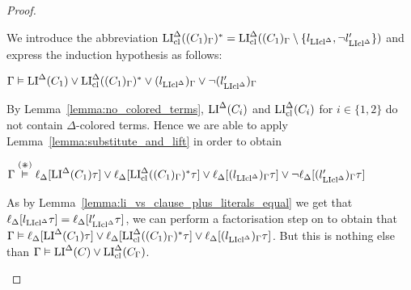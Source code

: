 \documentclass[,%
	draft=false,%
	numbers=noendperiod
	11pt,
	a4paper,
	oneside,%
	openany,
]{memoir}
\begin{document}
\begin{proof}
\begin{description}
			We introduce the abbreviation
			$\operatorname{LI}_{\operatorname{cl}}^\Delta( (C_1)_\Gamma)^* = \operatorname{LI}_{\operatorname{cl}}^\Delta( (C_1)_\Gamma \setminus \{l_{\operatorname{LIcl}^\Delta}, \lnot l'_{\operatorname{LIcl}^\Delta}\} )$
			and express the induction hypothesis as follows:

			$\Gamma \vDash \operatorname{LI}^\Delta(C_1) \lor \operatorname{LI}_{\operatorname{cl}}^\Delta( (C_1)_\Gamma)^* \lor (l_{\operatorname{LIcl}^\Delta})_\Gamma \lor \lnot (l'_{\operatorname{LIcl}^\Delta})_\Gamma$

			By Lemma~\ref{lemma:no_colored_terms}, $\operatorname{LI}^\Delta(C_i)$ and $\operatorname{LI}_{\operatorname{cl}}^\Delta(C_i)$ for $i\in\{1,2\}$ do not contain $\Delta$-colored terms. 
			Hence we are able to apply Lemma~\ref{lemma:substitute_and_lift} in order to obtain

			$\Gamma \stackrel{(\divideontimes)}{\vDash} \ell_{\Delta}[\operatorname{LI}^\Delta(C_1)\tau] \lor \ell_{\Delta}[\operatorname{LI}_{\operatorname{cl}}^\Delta( (C_1)_\Gamma)^*\tau] \lor \ell_{\Delta}[(l_{\operatorname{LIcl}^\Delta})_\Gamma\tau] \lor \lnot \ell_{\Delta}[(l'_{\operatorname{LIcl}^\Delta})_\Gamma\tau]$

			As by Lemma~\ref{lemma:li_vs_clause_plus_literals_equal} we get that 
			$\ell_{\Delta}[l_{\operatorname{LIcl}^\Delta}\tau] = 
			\ell_{\Delta}[l'_{\operatorname{LIcl}^\Delta}\tau]$,
			we can perform a factorisation step on \markC{} to obtain that 
			$\Gamma \vDash \ell_{\Delta}[\operatorname{LI}^\Delta(C_1)\tau] \lor \ell_{\Delta}[\operatorname{LI}_{\operatorname{cl}}^\Delta( (C_1)_\Gamma)^*\tau] \lor \ell_{\Delta}[(l_{\operatorname{LIcl}^\Delta})_\Gamma\tau]$.
			But this is nothing else than $\Gamma \vDash \operatorname{LI}^\Delta(C) \lor \operatorname{LI}_{\operatorname{cl}}^\Delta(C_\Gamma)$.
			\qedhere

	\end{description}
\end{proof}
\end{document}
